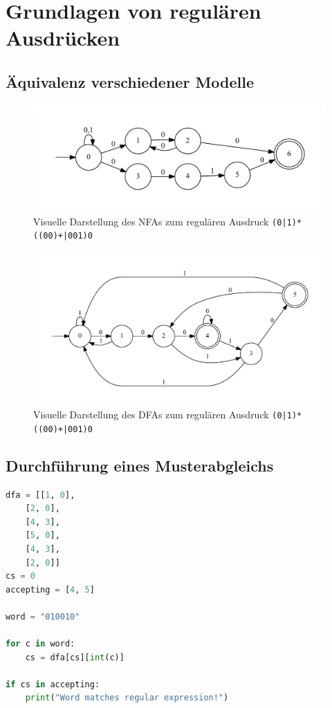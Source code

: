 \chapter{Grundlagen von regulären Ausdrücken}

\section{Äquivalenz verschiedener Modelle}


\begin{figure}[ht]
	\includegraphics[width=\textwidth]{bilder/nfa_beispiel.pdf}
	\caption{Visuelle Darstellung des NFAs zum regulären Ausdruck \texttt{(0|1)*((00)+|001)0}}
	\label{nfa_beispiel}
\end{figure}

\begin{figure}[ht]
	\includegraphics[width=\textwidth]{bilder/dfa_beispiel.pdf}
	\caption{Visuelle Darstellung des DFAs zum regulären Ausdruck \texttt{(0|1)*((00)+|001)0}}
	\label{dfa_beispiel}
\end{figure}

\section{Durchführung eines Musterabgleichs}

\begin{lstlisting}[language=Python,
caption=Durchführung des Musterabgleichs mithilfe eines DFA,
label=dfa_matching]
dfa = [[1, 0],
	[2, 0],
	[4, 3],
	[5, 0],
	[4, 3],
	[2, 0]]
cs = 0
accepting = [4, 5]

word = "010010"

for c in word:
	cs = dfa[cs][int(c)]

if cs in accepting:
	print("Word matches regular expression!")
\end{lstlisting}

